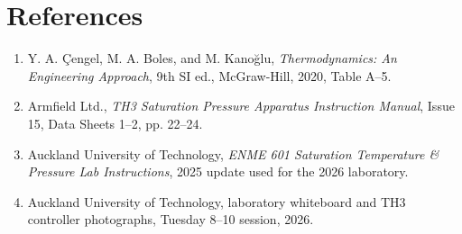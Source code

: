 \documentclass[11pt,a4paper]{article}
\begin{document}
\section*{References}
{\footnotesize
\begin{enumerate}[itemsep=0pt,topsep=2pt]
  \item Y. A. \c{C}engel, M. A. Boles, and M. Kano\u{g}lu,
  \emph{Thermodynamics: An Engineering Approach}, 9th SI ed., McGraw-Hill,
  2020, Table A--5.
  \item Armfield Ltd., \emph{TH3 Saturation Pressure Apparatus Instruction Manual},
  Issue 15, Data Sheets 1--2, pp. 22--24.
  \item Auckland University of Technology, \emph{ENME 601 Saturation Temperature
  \& Pressure Lab Instructions}, 2025 update used for the 2026 laboratory.
  \item Auckland University of Technology, laboratory whiteboard and TH3 controller
  photographs, Tuesday 8--10 session, 2026.
\end{enumerate}
}
\end{document}
